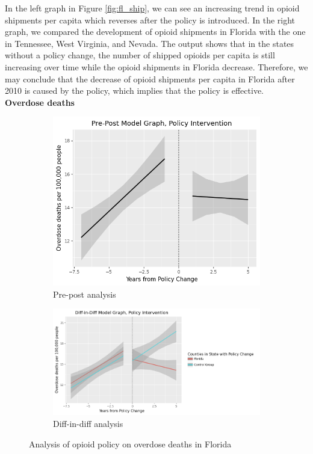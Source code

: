 \documentclass[12pt,letterpaper]{article}
\begin{document}
In the left graph in Figure \ref{fig:fl_ship}, we can see an increasing trend in opioid shipments per capita which reverses after the policy is introduced. In the right graph, we compared the development of opioid shipments in Florida with the one in Tennessee, West Virginia, and Nevada. The output shows that in the states without a policy change, the number of shipped opioids per capita is still increasing over time while the opioid shipments in Florida decrease. Therefore, we may conclude that the decrease of opioid shipments per capita in Florida after 2010 is caused by the policy, which implies that the policy is effective. \\

\noindent \textbf{Overdose deaths} \\

\begin{figure}[!h]
\centering
\begin{subfigure}{.5\textwidth}
  \centering
  \includegraphics[width=0.7\linewidth]{../30_results/General_Results/florida_overdose_death_prepost.png}
  \caption{Pre-post analysis}
  \label{fig:fl_death_prepost}
\end{subfigure}%
\begin{subfigure}{.55\textwidth}
  \centering
  \includegraphics[width=1\linewidth]{../30_results/General_Results/florida_overdose_death_diffdiff.png}
  \caption{Diff-in-diff analysis}
  \label{fig:fl_death_did}
\end{subfigure}
\caption{Analysis of opioid policy on overdose deaths in Florida}
\label{fig:fl_death}
\end{figure}
\end{document}
